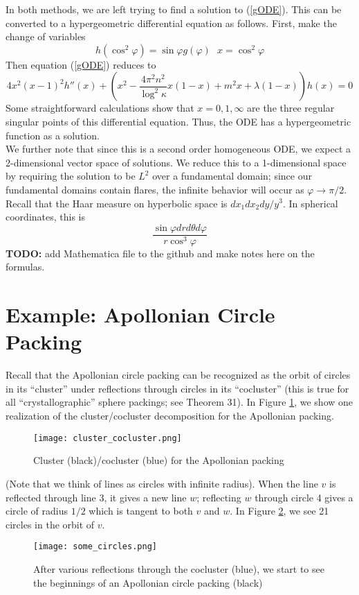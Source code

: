 \documentclass[]{article}
\begin{document}
In both methods, we are left trying to find a solution to (\ref{gODE}).
This can be converted to a hypergeometric differential equation as follows.
First, make the change of variables
$$
h(\cos^2\varphi) = \sin\varphi g(\varphi) ~~~ x = \cos^2\varphi
$$
Then equation (\ref{gODE}) reduces to
$$
4x^2(x - 1)^2h''(x) + \left( x^2 - \frac{4\pi^2n^2}{\log^2\kappa}x(1 - x) + m^2x + \lambda(1 - x) \right)h(x) = 0
$$
Some straightforward calculations show that $x = 0, 1, \infty$ are the three regular singular points of this differential equation.
Thus, the ODE has a hypergeometric function as a solution.
\\

We further note that since this is a second order homogeneous ODE, we expect a 2-dimensional vector space of solutions.
We reduce this to a 1-dimensional space by requiring the solution to be $L^2$ over a fundamental domain; since our fundamental domains contain flares, the infinite behavior will occur as $\varphi \rightarrow \pi/2$.
Recall that the Haar measure on hyperbolic space is $dx_1dx_2dy/y^3$.
In spherical coordinates, this is
$$
\frac{\sin\varphi drd\theta d\varphi}{r\cos^3\varphi}
$$
\textbf{TODO:} add Mathematica file to the github and make notes here on the formulas.

\section*{Example: Apollonian Circle Packing}

Recall that the Apollonian circle packing can be recognized as the orbit of circles in its ``cluster'' under reflections through circles in its ``cocluster'' (this is true for all ``crystallographic'' sphere packings; see \cite{kontorovich2017geometry} Theorem 31).
In Figure \ref{c_coc}, we show one realization of the cluster/cocluster decomposition for the Apollonian packing.
\begin{figure}[h]
	\centering
	\texttt{[image: cluster\_cocluster.png]}
	\caption{Cluster (black)/cocluster (blue) for the Apollonian packing}
	\label{c_coc}
\end{figure}
(Note that we think of lines as circles with infinite radius).
When the line $v$ is reflected through line 3, it gives a new line $w$; reflecting $w$ through circle 4 gives a circle of radius $1/2$ which is tangent to both $v$ and $w$.
In Figure \ref{orbit}, we see 21 circles in the orbit of $v$.
\begin{figure}[h]
	\centering
	\texttt{[image: some\_circles.png]}
	\caption{After various reflections through the cocluster (blue), we start to see the beginnings of an Apollonian circle packing (black)}
	\label{orbit}
\end{figure}
\end{document}
